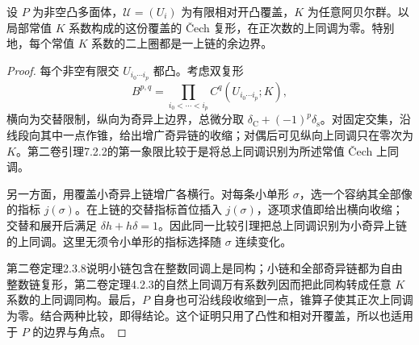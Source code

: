 \begin{lemma}\label{g4:lem:1204:convex-cech}
	设 \(P\) 为非空凸多面体，\(\mathcal U=(U_i)\) 为有限相对开凸覆盖，\(K\) 为任意阿贝尔群。以局部常值 \(K\) 系数构成的这份覆盖的 Čech 复形，在正次数的上同调为零。特别地，每个常值 \(K\) 系数的二上圈都是一上链的余边界。
\end{lemma}
\begin{proof}
	每个非空有限交 \(U_{i_0\cdots i_p}\) 都凸。考虑双复形
	\[
		B^{p,q}=\prod_{i_0<\cdots<i_p}C^q(U_{i_0\cdots i_p};K),
	\]
	横向为交替限制，纵向为奇异上边界，总微分取 \(\delta_{\mathrm C}+(-1)^p\delta_{\mathrm s}\)。对固定交集，沿线段向其中一点作锥，给出增广奇异链的收缩；对偶后可见纵向上同调只在零次为 \(K\)。第二卷引理7.2.2的第一象限比较于是将总上同调识别为所述常值 Čech 上同调。

	另一方面，用覆盖小奇异上链增广各横行。对每条小单形 \(\sigma\)，选一个容纳其全部像的指标 \(j(\sigma)\)。在上链的交替指标首位插入 \(j(\sigma)\)，逐项求值即给出横向收缩；交替和展开后满足 \(\delta h+h\delta=1\)。因此同一比较引理把总上同调识别为小奇异上链的上同调。这里无须令小单形的指标选择随 \(\sigma\) 连续变化。

	第二卷定理2.3.8说明小链包含在整数同调上是同构；小链和全部奇异链都为自由整数链复形，第二卷定理4.2.3的自然上同调万有系数列因而把此同构转成任意 \(K\) 系数的上同调同构。最后，\(P\) 自身也可沿线段收缩到一点，锥算子使其正次上同调为零。结合两种比较，即得结论。这个证明只用了凸性和相对开覆盖，所以也适用于 \(P\) 的边界与角点。
\end{proof}

